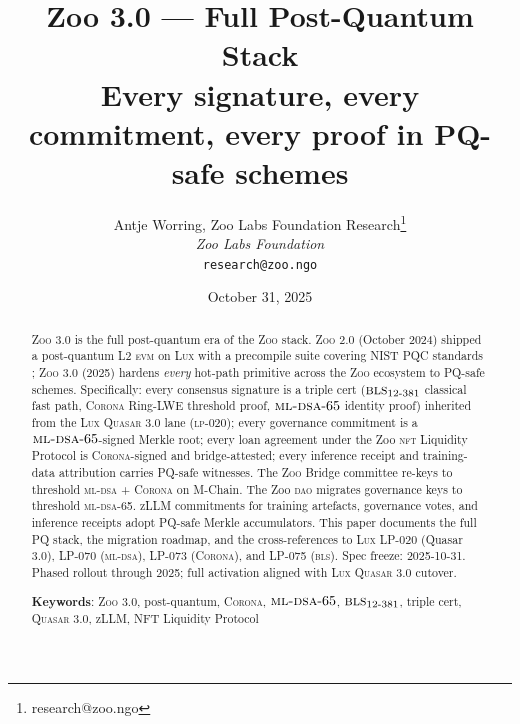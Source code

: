 \documentclass[11pt,letterpaper]{article}
\title{\textbf{Zoo 3.0 --- Full Post-Quantum Stack}\\
\large Every signature, every commitment, every proof in PQ-safe schemes}
\author{
Antje Worring, Zoo Labs Foundation Research\thanks{research@zoo.ngo}\\
\textit{Zoo Labs Foundation}\\
\texttt{research@zoo.ngo}
}
\date{October 31, 2025}
\newcommand{\Zoo}{\textsc{Zoo}}
\newcommand{\Lux}{\textsc{Lux}}
\newcommand{\Quasar}{\textsc{Quasar}}
\newcommand{\DAO}{\textsc{dao}}
\newcommand{\NFT}{\textsc{nft}}
\newcommand{\BLS}{\textsc{bls}}
\newcommand{\MLDSA}{\textsc{ml-dsa}}
\newcommand{\Corona}{\textsc{Corona}}
\begin{document}
\zoocoverpage

\begin{abstract}
\noindent \Zoo{} 3.0 is the full post-quantum era of the \Zoo{} stack.
\Zoo{} 2.0 (October 2024) shipped a post-quantum L2 \textsc{evm} on
\Lux{} with a precompile suite covering NIST PQC standards
\cite{zoo-2-0}; \Zoo{} 3.0 (2025) hardens \emph{every} hot-path
primitive across the \Zoo{} ecosystem to PQ-safe schemes.
Specifically: every consensus signature is a triple cert
($\BLS{}_{12\text{-}381}$ classical fast path, \Corona{} Ring-LWE
threshold proof, $\MLDSA{}\text{-}65$ identity proof) inherited from
the \Lux{} \Quasar{} 3.0 lane (\textsc{lp-020}); every governance
commitment is a $\MLDSA{}\text{-}65$-signed Merkle root; every loan
agreement under the Zoo \NFT{} Liquidity Protocol is \Corona{}-signed
and bridge-attested; every inference receipt and training-data
attribution carries PQ-safe witnesses. The \Zoo{} Bridge committee
re-keys to threshold \MLDSA{} + \Corona{} on M-Chain. The Zoo \DAO{}
migrates governance keys to threshold \MLDSA{}-65. zLLM commitments
for training artefacts, governance votes, and inference receipts
adopt PQ-safe Merkle accumulators. This paper documents the full
PQ stack, the migration roadmap, and the cross-references to \Lux{}
LP-020 (Quasar 3.0), LP-070 (\MLDSA{}), LP-073 (\Corona{}), and
LP-075 (\BLS{}). Spec freeze: 2025-10-31. Phased rollout through
2025; full activation aligned with \Lux{} \Quasar{} 3.0 cutover.

\textbf{Keywords}: \Zoo{} 3.0, post-quantum, \Corona{}, $\MLDSA{}\text{-}65$,
$\BLS{}_{12\text{-}381}$, triple cert, \Quasar{} 3.0, zLLM, NFT Liquidity
Protocol
\end{abstract}

\tableofcontents
\newpage








\end{document}

